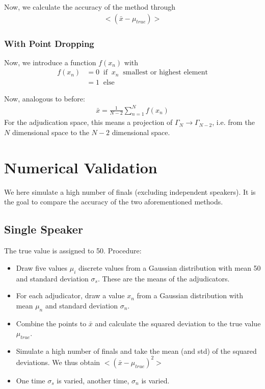 \documentclass[%
 reprint,
 amsmath,amssymb,
 aps,
]{revtex4-1}
\begin{document}
Now, we calculate the accuracy of the method through 
\begin{align}
<(\bar{x} - \mu_{true})>
\end{align}

\subsubsection{With Point Dropping}

Now, we introduce a function $f(x_n)$ with 
\begin{align}
f(x_n) &= 0 \;\; \text{if} \;\; x_n \;\; \text{smallest or highest element}\\
&= 1 \;\; \text{else} 
\end{align}

Now, analogous to before:
\begin{align}
\bar{x} = \frac{1}{N-2}\sum_{n=1}^{N} f(x_n)
\end{align}
For the adjudication space, this means a projection of $\Gamma_N \rightarrow \Gamma_{N-2}$, i.e. from the $N$ dimensional space to the $N-2$ dimensional space. 


\section{Numerical Validation}

We here simulate a high number of finals (excluding independent speakers). It is the goal to compare the accuracy of the two aforementioned methods.
\subsection{Single Speaker}
 The true value is assigned to 50. Procedure:
\begin{itemize}
	\item Draw five values $\mu_i$ discrete values from a Gaussian distribution with mean 50 and standard deviation $\sigma_s$. These are the means of the adjudicators.
	\item For each adjudicator, draw a value $x_n$ from a Gaussian distribution with mean $\mu_n$ and standard deviation $\sigma_n$. 
	\item Combine the points to $\bar{x}$ and calculate the squared deviation to the true value $\mu_{true}$.
	\item Simulate a high number of finals and take the mean (and std) of the squared deviations. We thus obtain $<(\bar{x} - \mu_{true})^2>$
	\item One time $\sigma_s$ is varied, another time, $\sigma_n$ is varied.
\end{itemize}
\end{document}
